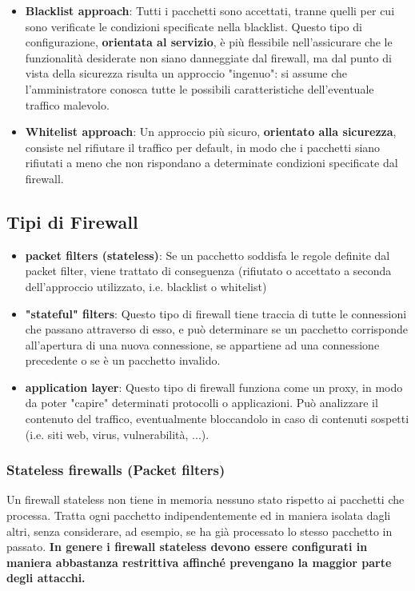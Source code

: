 \begin{itemize}
\item \textbf{Blacklist approach}: Tutti i pacchetti sono accettati, tranne quelli per cui sono verificate le condizioni specificate nella blacklist. Questo tipo di configurazione, \textbf{orientata al servizio}, è più flessibile nell'assicurare che le funzionalità desiderate non siano danneggiate dal firewall, ma dal punto di vista della sicurezza risulta un approccio "ingenuo": si assume che l'amministratore conosca tutte le possibili caratteristiche dell'eventuale traffico malevolo.

\item \textbf{Whitelist approach}: Un approccio più sicuro, \textbf{orientato alla sicurezza}, consiste nel rifiutare il traffico per default, in modo che i pacchetti siano rifiutati a meno che non rispondano a determinate condizioni specificate dal firewall. 
\end{itemize}

\subsection{Tipi di Firewall}
\begin{itemize}
\item \textbf{packet filters (stateless)}: Se un pacchetto soddisfa le regole definite dal packet filter, viene trattato di conseguenza (rifiutato o accettato a seconda dell'approccio utilizzato, i.e. blacklist o whitelist)
\item \textbf{"stateful" filters}: Questo tipo di firewall tiene traccia di tutte le connessioni che passano attraverso di esso, e può determinare se un pacchetto corrisponde all'apertura di una nuova connessione, se appartiene ad una connessione precedente o se è un pacchetto invalido.
\item \textbf{application layer}: Questo tipo di firewall funziona come un proxy, in modo da poter "capire" determinati protocolli o applicazioni. Può analizzare il contenuto del traffico, eventualmente bloccandolo in caso di contenuti sospetti (i.e. siti web, virus, vulnerabilità, ...).
\end{itemize}
\subsubsection{Stateless firewalls (Packet filters)}
Un firewall stateless non tiene in memoria nessuno stato rispetto ai pacchetti che processa. Tratta ogni pacchetto indipendentemente ed in maniera isolata dagli altri, senza considerare, ad esempio, se ha già processato lo stesso pacchetto in passato. \textbf{In genere i firewall stateless devono essere configurati in maniera abbastanza restrittiva affinché prevengano la maggior parte degli attacchi.}

